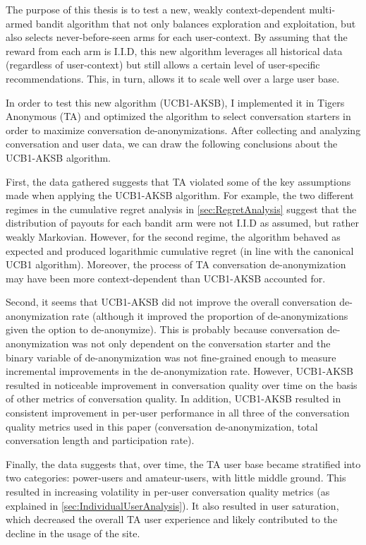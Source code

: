 The purpose of this thesis is to test a new, weakly context-dependent multi-armed bandit algorithm that not only balances exploration and exploitation, but also selects never-before-seen arms for each user-context. By assuming that the reward from each arm is I.I.D, this new algorithm leverages all historical data (regardless of user-context) but still allows a certain level of user-specific recommendations. This, in turn, allows it to scale well over a large user base.

In order to test this new algorithm (UCB1-AKSB), I implemented it in Tigers Anonymous (TA) and optimized the algorithm to select conversation starters in order to maximize conversation de-anonymizations. After collecting and analyzing conversation and user data, we can draw the following conclusions about the UCB1-AKSB algorithm.

First, the data gathered suggests that TA violated some of the key assumptions made when applying the UCB1-AKSB algorithm. For example, the two different regimes in the cumulative regret analysis in \autoref{sec:RegretAnalysis} suggest that the distribution of payouts for each bandit arm were not I.I.D as assumed, but rather weakly Markovian. However, for the second regime, the algorithm behaved as expected and produced logarithmic cumulative regret (in line with the canonical UCB1 algorithm). Moreover, the process of TA conversation de-anonymization may have been more context-dependent than UCB1-AKSB accounted for.

Second, it seems that UCB1-AKSB did not improve the overall conversation de-anonymization rate (although it improved the proportion of de-anonymizations given the option to de-anonymize). This is probably because conversation de-anonymization was not only dependent on the conversation starter and the binary variable of de-anonymization was not fine-grained enough to measure incremental improvements in the de-anonymization rate. However, UCB1-AKSB resulted in noticeable improvement in conversation quality over time on the basis of other metrics of conversation quality. In addition, UCB1-AKSB resulted in consistent improvement in per-user performance in all three of the conversation quality metrics used in this paper (conversation de-anonymization, total conversation length and participation rate).

Finally, the data suggests that, over time, the TA user base became stratified into two categories: power-users and amateur-users, with little middle ground. This resulted in increasing volatility in per-user conversation quality metrics (as explained in \autoref{sec:IndividualUserAnalysis}). It also resulted in user saturation, which decreased the overall TA user experience and likely contributed to the decline in the usage of the site.

